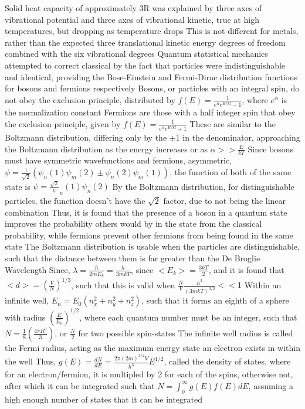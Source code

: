 \documentclass[11 pt, twoside]{article}
\newenvironment{outline*}
{
	\begin{outline}[enumerate]
	}
	{\end{outline}
}
\begin{document}
\begin{outline*}
		\3 Solid heat capacity of approximately 3R was explained by three axes of vibrational potential and three axes of vibrational kinetic, true at high temperatures, but dropping as temperature drops
			\4 This is not different for metals, rather than the expected three translational kinetic energy degrees of freedom combined with the six vibrational degrees
\1 Quantum statistical mechanics attempted to correct classical by the fact that particles were indistinguishable and identical, providing the Bose-Einstein and Fermi-Dirac distribution functions for bosons and fermions respectively
	\2 Bosons, or particles with an integral spin, do not obey the exclusion principle, distributed by $f(E) = \frac{1}{e^{\alpha}e^{E/kt} - 1}$, where $e^{\alpha}$ is the normalization constant
		\3 Fermions are those with a half integer spin that obey the exclusion principle, given by $f(E) = \frac{1}{e^{\alpha}e^{E/kt} + 1}$
	\2 These are similar to the Boltzmann distribution, differing only by the $\pm 1$ in the denominator, approaching the Boltzmann distribution as the energy increases or as $\alpha >> \frac{E}{kT}$
		\3 Since bosons must have symmetric wavefunctions and fermions, asymmetric, $\psi = \frac{1}{\sqrt{2}}(\psi_n(1)\psi_m(2) \pm \psi_n(2)\psi_m(1))$, the function of both of the same state is $\psi = \frac{\sqrt{2}}\psi_n(1)\psi_n(2)$
		\3 By the Boltzmann distribution, for distinguishable particles, the function doesn't have the $\sqrt{2}$ factor, due to not being the linear combination
		\3 Thus, it is found that the presence of a boson in a quantum state improves the probability others would by in the state from the classical probability, while fermions prevent other fermions from being found in the same state
	\2 The Boltzmann distribution is usable when the particles are distinguishable, such that the distance between them is far greater than the De Broglie Wavelength
		\3 Since, $\lambda = \frac{h}{2mE_k} = \frac{h}{3mkT}$, since $<E_k> = \frac{3kT}{2}$, and it is found that $<d> = (\frac{V}{N})^{1/3}$, such that this is valid when $\frac{N}{V}\frac{h^3}{(3mkT)^{3/2}} << 1$
		\3 Within an infinite well, $E_n = E_0(n_x^2 + n_y^2 + n_z^2)$, such that it forms an eighth of a sphere with radius $(\frac{E}{E_0})^{1/2}$, where each quantum number must be an integer, such that $N = \frac{1}{8}(\frac{4\pi R^3}{3})$, or $\frac{N}{2}$ for two possible spin-states
			\4 The infinite well radius is called the Fermi radius, acting as the maximum energy state an electron exists in within the well
			\4 Thus, $g(E) = \frac{dN}{dE} = \frac{2\pi(2m)^{3/2}V}{h^3}E^{1/2}$, called the density of states, where for an electron/fermion, it is multipled by 2 for each of the spins, otherwise not, after which it can be integrated such that $N = \int^{\infty}_0 g(E)f(E)dE$, assuming a high enough number of states that it can be integrated

\end{outline*}
\end{document}
